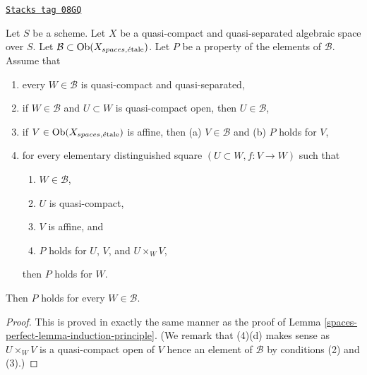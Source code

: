 \begin{lemma}
\label{spaces-perfect-lemma-induction-principle-separated}
\href{https://stacks.math.columbia.edu/tag/08GQ}{\texttt{Stacks tag 08GQ}}

Let $S$ be a scheme. Let $X$ be a quasi-compact and quasi-separated
algebraic space over $S$. Let
$\mathcal{B} \subset \operatorname{Ob}(X_{spaces, \acute{e}\text{tale}})$.
Let $P$ be a property of the elements of $\mathcal{B}$.
Assume that
\begin{enumerate}
\item every $W \in \mathcal{B}$ is quasi-compact and quasi-separated,
\item if $W \in \mathcal{B}$ and $U \subset W$ is quasi-compact open, then
$U \in \mathcal{B}$,
\item if $V \in \operatorname{Ob}(X_{spaces, \acute{e}\text{tale}})$ is affine, then
(a) $V \in \mathcal{B}$ and (b) $P$ holds for $V$,
\item for every elementary distinguished square $(U \subset W, f : V \to W)$
such that
\begin{enumerate}
\item $W \in \mathcal{B}$,
\item $U$ is quasi-compact,
\item $V$ is affine, and
\item $P$ holds for $U$, $V$, and $U \times_W V$,
\end{enumerate}
then $P$ holds for $W$.
\end{enumerate}
Then $P$ holds for every $W \in \mathcal{B}$.
\end{lemma}

\begin{proof}
This is proved in exactly the same manner as the proof of
Lemma \ref{spaces-perfect-lemma-induction-principle}.
(We remark that (4)(d) makes sense as $U \times_W V$ is a quasi-compact
open of $V$ hence an element of $\mathcal{B}$ by conditions
(2) and (3).)
\end{proof}

